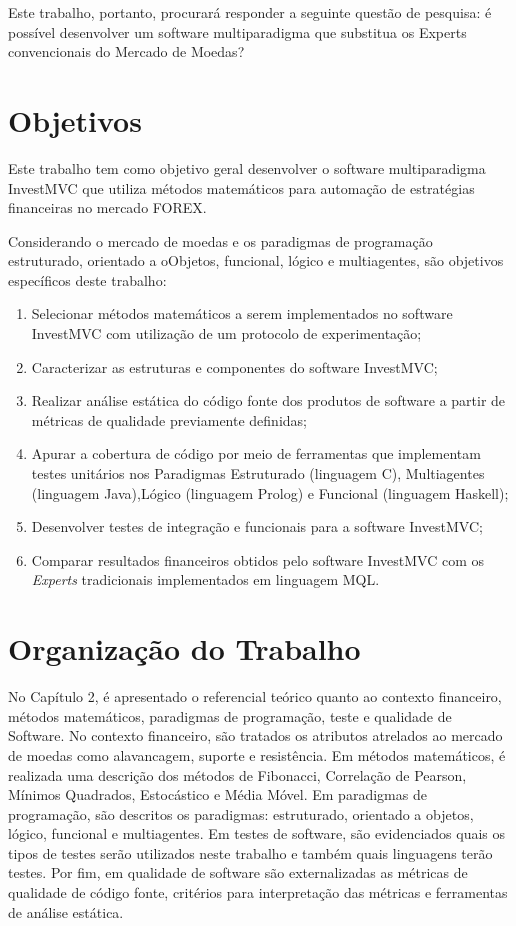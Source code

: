 Este trabalho, portanto, procurará responder a seguinte questão de pesquisa: é possível desenvolver um software multiparadigma que substitua os Experts convencionais do Mercado de Moedas?

\section{Objetivos}
Este trabalho tem como objetivo geral desenvolver o software multiparadigma InvestMVC que utiliza métodos matemáticos para automação de estratégias financeiras no mercado FOREX.

Considerando o mercado de moedas e os paradigmas de programação estruturado, orientado a oObjetos, funcional, lógico e multiagentes, são objetivos específicos deste trabalho:

\begin{enumerate}
\item  Selecionar métodos matemáticos a serem implementados no software InvestMVC com utilização de um protocolo de experimentação;

\item Caracterizar as estruturas e componentes do software InvestMVC;

\item Realizar análise estática do código fonte dos produtos de software a partir de métricas de qualidade previamente definidas;

\item  Apurar a cobertura de código por meio de ferramentas que implementam testes unitários nos Paradigmas Estruturado (linguagem C), Multiagentes (linguagem Java),Lógico (linguagem Prolog) e Funcional (linguagem Haskell);

\item Desenvolver testes de integração e funcionais para a software InvestMVC;

\item Comparar resultados financeiros obtidos pelo software InvestMVC com os \textit{Experts} tradicionais implementados em linguagem MQL.
\end{enumerate}

\section{Organização do Trabalho}
No Capítulo 2, é apresentado o referencial teórico quanto ao contexto financeiro, métodos matemáticos, paradigmas de programação, teste e qualidade de Software. No contexto financeiro, são tratados os atributos atrelados ao mercado de moedas como alavancagem, suporte e resistência. Em métodos matemáticos, é realizada uma descrição dos métodos de Fibonacci, Correlação de Pearson, Mínimos Quadrados, Estocástico e Média Móvel. Em paradigmas de programação, são descritos os paradigmas: estruturado, orientado a objetos, lógico, funcional e multiagentes. Em testes de software, são evidenciados quais os tipos de testes serão utilizados neste trabalho e também quais linguagens terão testes. Por fim, em qualidade de software são externalizadas as métricas de qualidade de código fonte, critérios para interpretação das métricas e ferramentas de análise estática.

